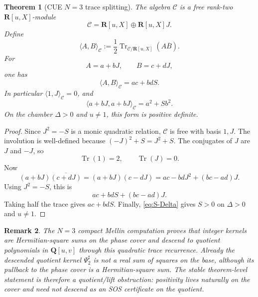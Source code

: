 \documentclass[11pt]{article}
\newcommand{\R}{\mathbf R}
\newcommand{\Q}{\mathbf Q}
\newcommand{\Tr}{\operatorname{Tr}}
\newcommand{\1}{\mathbf 1}
\newtheorem{theorem}{Theorem}[section]
\newtheorem{remark}[theorem]{Remark}
\numberwithin{equation}{section}
\begin{document}
\begin{theorem}[CUE $N=3$ trace splitting]\label{thm:N3-trace}
The algebra $\mathcal C$ is a free rank-two $\R[u,X]$-module
\begin{equation}
  \mathcal C=\R[u,X]\oplus \R[u,X]J.
\end{equation}
Define
\begin{equation}
  \langle A,B\rangle_{\mathcal C}:=\frac12\Tr_{\mathcal C/\R[u,X]}(A\overline B).
\end{equation}
For
\begin{equation}
  A=a+bJ,
  \qquad
  B=c+dJ,
\end{equation}
one has
\begin{equation}
  \langle A,B\rangle_{\mathcal C}=ac+bdS.
\end{equation}
In particular $\langle1,J\rangle_{\mathcal C}=0$, and
\begin{equation}
  \langle a+bJ,a+bJ\rangle_{\mathcal C}=a^2+Sb^2.
\end{equation}
On the chamber $\Delta>0$ and $u\ne1$, this form is positive definite.
\end{theorem}

\begin{proof}
Since $J^2=-S$ is a monic quadratic relation, $\mathcal C$ is free with basis $1,J$.  The involution is well-defined because $(-J)^2+S=J^2+S$.  The conjugates of $J$ are $J$ and $-J$, so
\begin{equation}
  \Tr(1)=2,
  \qquad
  \Tr(J)=0.
\end{equation}
Now
\begin{equation}
  (a+bJ)\overline{(c+dJ)}=(a+bJ)(c-dJ)=ac-bdJ^2+(bc-ad)J.
\end{equation}
Using $J^2=-S$, this is
\begin{equation}
  ac+bdS+(bc-ad)J.
\end{equation}
Taking half the trace gives $ac+bdS$.  Finally, \eqref{eq:S-Delta} gives $S>0$ on $\Delta>0$ and $u\ne1$.
\end{proof}

\begin{remark}
The $N=3$ compact Mellin computation proves that integer kernels are Hermitian-square sums on the phase cover and descend to quotient polynomials in $\Q[u,v]$ through this quadratic trace recurrence.  Already the descended quotient kernel $\Psi_2^\sharp$ is not a real sum of squares on the base, although its pullback to the phase cover is a Hermitian-square sum.  The stable theorem-level statement is therefore a quotient/lift obstruction: positivity lives naturally on the cover and need not descend as an SOS certificate on the quotient.
\end{remark}
\end{document}
